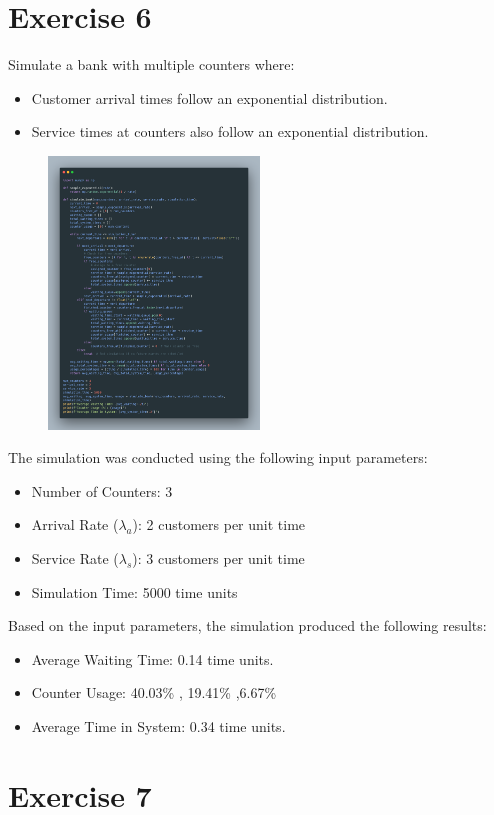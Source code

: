 \documentclass[a4paper,12pt]{article}
\begin{document}
\section{Exercise 6}
Simulate a bank with multiple counters where:
\begin{itemize}
    \item Customer arrival times follow an exponential distribution.
    \item Service times at counters also follow an exponential distribution.
\end{itemize}
\begin{figure}[h!]
    \centering
    \includegraphics[width=0.5\textwidth]{./Screenshots/6.py.png}
\end{figure}
The simulation was conducted using the following input parameters:
\begin{itemize}
    \item Number of Counters: 3
    \item Arrival Rate (\(\lambda_a\)): 2 customers per unit time
    \item Service Rate (\(\lambda_s\)): 3 customers per unit time
    \item Simulation Time: 5000 time units
\end{itemize}
Based on the input parameters, the simulation produced the following results:
\begin{itemize}
    \item Average Waiting Time: 0.14 time units.
    \item Counter Usage: 40.03\% ,  19.41\% ,6.67\% 
    \item Average Time in System: 0.34 time units.
\end{itemize}
\newpage
\section{Exercise 7}
\end{document}
